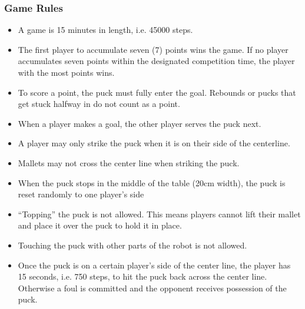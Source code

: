 \subsubsection{Game Rules}
\begin{itemize}
    \item A game is 15 minutes in length, i.e. 45000 steps.
    \item The first player to accumulate seven (7) points wins the game. If no player accumulates seven points within the designated competition time, the player with the most points wins.
    \item To score a point, the puck must fully enter the goal. Rebounds or pucks that get stuck halfway in do not count as a point.
    \item When a player makes a goal, the other player serves the puck next.
    \item A player may only strike the puck when it is on their side of the centerline.
    \item Mallets may not cross the center line when striking the puck.
    \item When the puck stops in the middle of the table (20cm width), the puck is reset randomly to one player's side
    \item “Topping” the puck is not allowed. This means players cannot lift their mallet and place it over the puck to hold it in place.
    \item Touching the puck with other parts of the robot is not allowed.
    \item Once the puck is on a certain player's side of the center line, the player has 15 seconds, i.e. 750 steps, to hit the puck back across the center line. Otherwise a foul is committed and the opponent receives possession of the puck.
\end{itemize}
